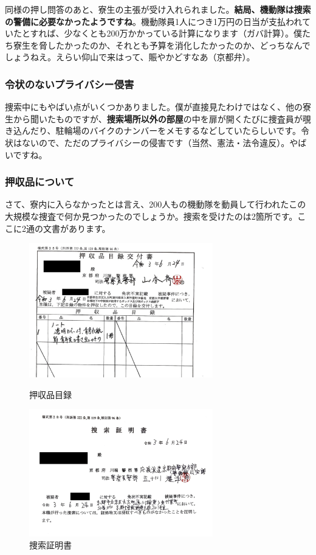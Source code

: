 同様の押し問答のあと、寮生の主張が受け入れられました。\textbf{結局、機動隊は捜索の警備に必要なかったようですね}。機動隊員1人につき1万円の日当が支払われていたとすれば、少なくとも200万かかっている計算になります（ガバ計算）。僕たち寮生を脅したかったのか、それとも予算を消化したかったのか、どっちなんでしょうねえ。えらい仰山で来はって、賑やかどすなあ（京都弁）。


\subsubsection{令状のないプライバシー侵害}

捜索中にもやばい点がいくつかありました。僕が直接見たわけではなく、他の寮生から聞いたものですが、\textbf{捜索場所以外の部屋}の中を扉が開くたびに捜査員が覗き込んだり、駐輪場のバイクのナンバーをメモするなどしていたらしいです。令状はないので、ただのプライバシーの侵害です（当然、憲法・法令違反）。やばいですね。


\subsubsection{押収品について}

さて、寮内に入らなかったとは言え、200人もの機動隊を動員して行われたこの大規模な捜査で何か見つかったのでしょうか。捜索を受けたのは2箇所です。ここに2通の文書があります。
\begin{figure}[h]
  \begin{minipage}{0.5\textwidth}
    \centering
    \includegraphics[width=8cm]{gazo/oushuhinmokuroku.jpg}
    \caption*{{\small 押収品目録}}
  \end{minipage}
  \begin{minipage}{0.5\textwidth}
    \centering
    \includegraphics[width=8cm]{gazo/sosakushomesho.jpg}
    \caption*{{\small 捜索証明書}}
  \end{minipage}
\end{figure}

